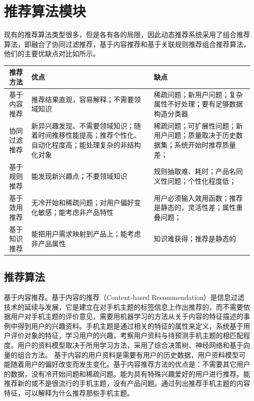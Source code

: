   \section{推荐算法模块}
  现有的推荐算法类型很多，但是各有各的局限，因此动态推荐系统采用了组合推荐算法，即融合了协同过滤推荐，基于内容推荐和基于关联规则推荐组合推荐算法，他们的主要优缺点对比如所示。
  \begin{table}[htp]
  \centering
  \label{tab:algarithm}
  \begin{tabular}{ |c|p{6cm}|p{6cm}| } \hline
   推荐方法 & 优点 & 缺点 \\ \hline
   基于内容推荐 & 推荐结果直观，容易解释；不需要领域知识 & 稀疏问题；新用户问题；复杂属性不好处理；要有足够数据构造分类器 \\ \hline
   协同过滤推荐 & 新异兴趣发现、不需要领域知识；随着时间推移性能提高；推荐个性化、自动化程度高；能处理复杂的非结构化对象 & 稀疏问题；可扩展性问题；新用户问题；质量取决于历史数据集；系统开始时推荐质量差； \\ \hline
   基于规则推荐 & 能发现新兴趣点；不要领域知识 & 规则抽取难、耗时；产品名同义性问题；个性化程度低； \\ \hline
   基于效用推荐 & 无冷开始和稀疏问题；对用户偏好变化敏感；能考虑非产品特性 & 用户必须输入效用函数；推荐是静态的，灵活性差；属性重叠问题； \\ \hline
   基于知识推荐 & 能把用户需求映射到产品上；能考虑非产品属性 & 知识难获得；推荐是静态的\\ \hline
  \end{tabular}
  \end{table}
    
    \subsection{推荐算法}
    基于内容推荐。基于内容的推荐（Content-based Recommendation）是信息过滤技术的延续与发展，它是建立在对手机主题的标签信息上作出推荐的，而不需要依据用户对手机主题的评价意见，需要用机器学习的方法从关于内容的特征描述的事例中得到用户的兴趣资料。手机主题是通过相关的特征的属性来定义，系统基于用户评价对象的特征，学习用户的兴趣，考察用户资料与待预测手机主题的相匹配程度。用户的资料模型取决于所用学习方法，采用了综合决策树、神经网络和基于向量的组合方法。 基于内容的用户资料是需要有用户的历史数据，用户资料模型可能随着用户的偏好改变而发生变化。基于内容推荐方法的优点是：不需要其它用户的数据，没有冷开始问题和稀疏问题。能为具有特殊兴趣爱好的用户进行推荐。能推荐新的或不是很流行的手机主题，没有产品问题。通过列出推荐手机主题的内容特征，可以解释为什么推荐那些手机主题。

